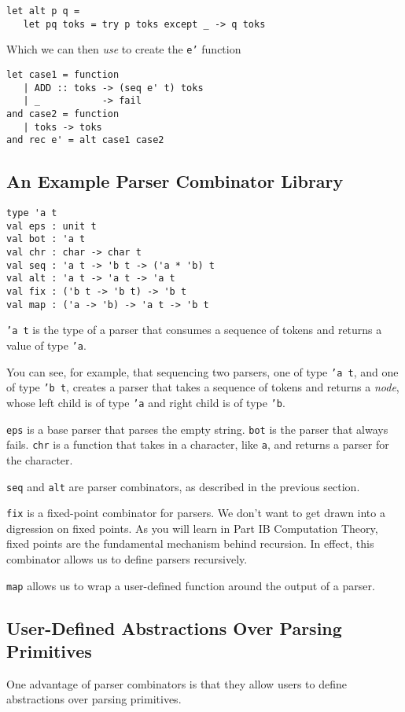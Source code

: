 \begin{verbatim}
let alt p q = 
   let pq toks = try p toks except _ -> q toks
\end{verbatim}

Which we can then \textit{use} to create the \texttt{e'} function
\begin{verbatim}
let case1 = function
   | ADD :: toks -> (seq e' t) toks
   | _           -> fail
and case2 = function
   | toks -> toks
and rec e' = alt case1 case2
\end{verbatim}

\subsection{An Example Parser Combinator Library}
\begin{verbatim}
type 'a t
val eps : unit t
val bot : 'a t
val chr : char -> char t
val seq : 'a t -> 'b t -> ('a * 'b) t
val alt : 'a t -> 'a t -> 'a t
val fix : ('b t -> 'b t) -> 'b t
val map : ('a -> 'b) -> 'a t -> 'b t
\end{verbatim}
\texttt{'a t} is the type of a parser that consumes a sequence of tokens and returns a value of type \texttt{'a}. 

You can see, for example, that sequencing two parsers, one of type \texttt{'a t}, and one of type \texttt{'b t}, creates a parser that takes a sequence of tokens and returns a \textit{node}, whose left child is of type \texttt{'a} and right child is of type \texttt{'b}.

\texttt{eps} is a base parser that parses the empty string. \texttt{bot} is the parser that always fails. \texttt{chr} is a function that takes in a character, like \texttt{a}, and returns a parser for the character. 

\texttt{seq} and \texttt{alt} are parser combinators, as described in the previous section.

\texttt{fix} is a fixed-point combinator for parsers. We don't want to get drawn into a digression on fixed points. As you will learn in \textsf{Part IB Computation Theory}, fixed points are the fundamental mechanism behind recursion. In effect, this combinator allows us to define parsers recursively.

\texttt{map} allows us to wrap a user-defined function around the output of a parser.

\subsection{User-Defined Abstractions Over Parsing Primitives}
One advantage of parser combinators is that they allow users to define abstractions over parsing primitives. 

